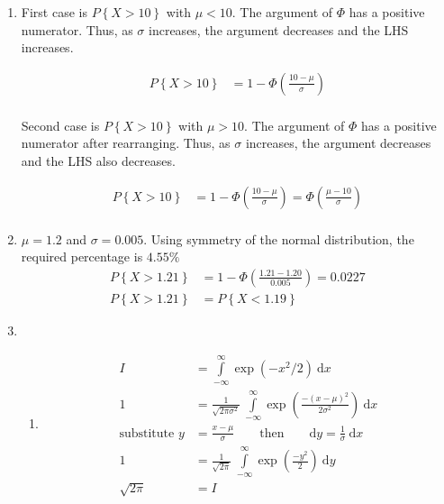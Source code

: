 \begin{enumerate}
	
	\item 
		First case is $ P \left\{X > 10\right\} $ with $ \mu < 10 $. The argument of $ \Phi $ has a positive numerator. Thus, as $ \sigma $ increases, the argument decreases and the LHS increases.
		
		\begin{align}
			P \left\{X > 10\right\} &= 1 - \Phi\left(\frac{10 - \mu}{\sigma}\right)\nonumber \\
		\end{align}
		
		Second case is $ P \left\{X > 10\right\} $ with $ \mu > 10 $. The argument of $ \Phi $ has a positive numerator after rearranging. Thus, as $ \sigma $ increases, the argument decreases and the LHS also decreases.
		
		\begin{align}
			P \left\{X > 10\right\} &= 1 - \Phi\left(\frac{10 - \mu}{\sigma}\right)\nonumber = \Phi\left(\frac{\mu - 10}{\sigma}\right)\nonumber \\
		\end{align}
	
	
	\item 
	
		$ \mu = 1.2$ and $\sigma = 0.005$. Using symmetry of the normal distribution, the required percentage is $ 4.55\%$\\
		
		\begin{align}
			P \left\{X > 1.21\right\} &= 1 - \Phi\left(\frac{1.21 - 1.20}{0.005}\right) = 0.0227 \nonumber \\
			P \left\{X > 1.21\right\} &= P \left\{X < 1.19\right\}
		\end{align}
		
	
	
	\item 
			
		\begin{enumerate}
			\item \begin{align}
				I &= \int\limits_{-\infty}^{\infty} \exp(-x^2/2) \ \mathrm{d}x \nonumber \\
				1 &= \frac{1}{\sqrt{2\pi\sigma^2}}\ \int\limits_{-\infty}^{\infty} \exp\left(\frac{-(x-\mu)^2}{2 \sigma^2}\right) \ \mathrm{d}x \nonumber \\
				\text{substitute } y &= \frac{x-\mu}{\sigma} \qquad \text{then} \qquad \mathrm{d}y = \frac{1}{\sigma} \ \mathrm{d}x \nonumber \\
				1 &= \frac{1}{\sqrt{2\pi}}\ \int\limits_{-\infty}^{\infty} \exp\left(\frac{-y^2}{2}\right) \ \mathrm{d}y \nonumber \\
				\sqrt{2\pi} &= I
			\end{align}
			

\end{enumerate}
\end{enumerate}
